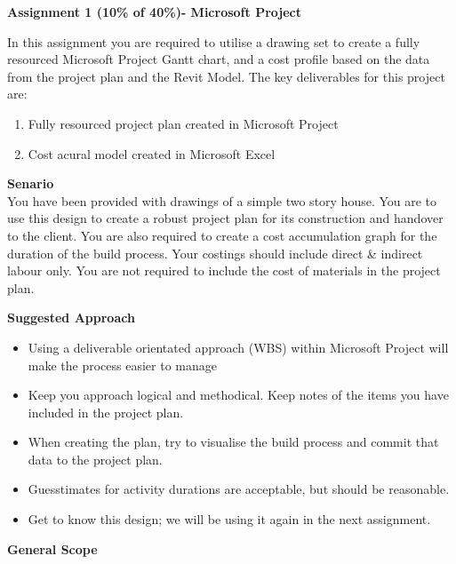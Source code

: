 
	
\begin{flushleft}
\Large\textbf{Assignment 1 (10\% of 40\%)- Microsoft Project}\\
\end{flushleft}

In this assignment you are required to utilise a drawing set to create a fully resourced Microsoft Project Gantt chart, and a cost profile based on the data from the project plan and the Revit Model.  The key deliverables for this project are:

\begin{enumerate}
	\item Fully resourced project plan created in Microsoft Project
	\item Cost acural model created in Microsoft Excel
\end{enumerate}

\textbf{Senario}\\


You have been provided with drawings of a simple two story house.  You are to use this design to create a robust project plan for its construction and handover to the client.  You are also required to create a cost accumulation graph for the duration of the build process.  Your costings should include direct \& indirect labour only.  You are not required to include the cost of materials in the project plan.


\vspace{.5cm}

\textbf{Suggested Approach}

\begin{itemize}
	\item Using a deliverable orientated approach (WBS) within Microsoft Project will make the process easier to manage
	\item Keep you approach logical and methodical.  Keep notes of the items you have included in the project plan.
	\item When creating the plan, try to visualise the build process and commit that data to the project plan.
	\item Guesstimates for activity durations are acceptable, but should be reasonable.
	\item Get to know this design; we will be using it again in the next assignment.
\end{itemize}


\textbf{General Scope}

